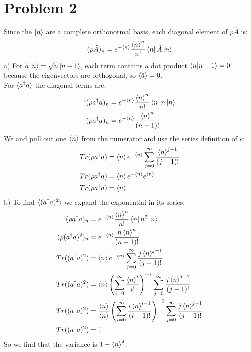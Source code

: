 \documentclass[a4paper,11pt]{article}
\numberwithin{equation}{section}
\begin{document}
\section{Problem 2}
Since the $\ket{n}$ are a complete orthonormal basis, each diagonal element of $\rho\hat{A}$ is:
\begin{align}
 (\rho\hat{A})_n=e^{-\braket{n}}\frac{\braket{n}^n}{n!}\bra{n}\hat{A}\ket{n}
\end{align}
a) For $\hat{a}\ket{n}=\sqrt{n}\ket{n-1}$, each term contains a dot product $\braket{n|n-1}=0$ because the eigenvectors are orthogonal, so $\braket{\hat{a}}=0$.\\
For $\braket{a^\dagger a}$ the diagonal terms are:
\begin{align}`
  (\rho a^\dagger a)_n&=e^{-\braket{n}}\frac{\braket{n}^n}{n!}\bra{n}n\ket{n}\\
  (\rho a^\dagger a)_n&=e^{-\braket{n}}\frac{\braket{n}^{n}}{(n-1)!}
\end{align}
We and pull out one $\braket{n}$ from the numerator and use the series definition of $e$:
\begin{align}
 Tr(\rho a^\dagger a)&=\braket{n}e^{-\braket{n}}\sum_{j=0}^\infty\frac{\braket{n}^{j-1}}{(j-1)!}\\
 Tr(\rho a^\dagger a)&=\braket{n}e^{-\braket{n}}e^{\braket{n}}\\
 Tr(\rho a^\dagger a)&=\braket{n}
\end{align}
b) To find $\braket{(a^\dagger a)^2}$ we expand the exponential in its series:
\begin{align}
  (\rho a^\dagger a)_n&=e^{-\braket{n}}\frac{\braket{n}^n}{n!}\bra{n}n^2\ket{n}\\
  (\rho (a^\dagger a)^2)_n&=e^{-\braket{n}}\frac{n\braket{n}^{n}}{(n-1)!}\\
  Tr((a^\dagger a)^2)&=\braket{n}e^{-\braket{n}}\sum_{j=0}^\infty\frac{j\braket{n}^{j-1}}{(j-1)!}\\
  Tr((a^\dagger a)^2)&=\braket{n} \left(\sum_{i=0}^\infty\frac{\braket{n}^i}{i!} \right)^{-1}   \sum_{j=0}^\infty\frac{j\braket{n}^{j-1}}{(j-1)!}\\
  Tr((a^\dagger a)^2)&=\frac{\braket{n}}{\braket{n}}\left(\sum_{i=0}^\infty\frac{i\braket{n}^{i-1}}{(i-1)!} \right)^{-1}   \sum_{j=0}^\infty\frac{j\braket{n}^{j-1}}{(j-1)!}\\
  Tr((a^\dagger a)^2)&=1
\end{align}
So we find that the variance is $1-\braket{n}^2$.
\\
\end{document}
